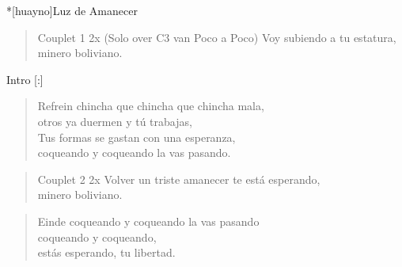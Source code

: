 \clearpage
\begin{song}*[huayno]{Luz de Amanecer}
\begin{verse}{Couplet 1 2x (Solo over C3 van Poco a Poco)}
Voy subiendo a tu estatura, \\
minero boliviano. \hspace{4em} \hspace{1em} 
\end{verse}

\begin{instrumental}{Intro}
\measure{}\measure{}\measure{}\measure{}
\measure{}\measure{}\measure{}\measure{}[:]
\end{instrumental}


\begin{verse}{Refrein}
chincha que chincha que chincha mala,\\
otros ya duermen y tú trabajas,\\
Tus formas se gastan con una esperanza,\\
coqueando y coqueando la vas pasando. \hspace{4em} \hspace{1em} 
\end{verse}


\begin{verse}{Couplet 2 2x}
Volver un triste amanecer te está esperando,\\
minero boliviano. \hspace{4em} \hspace{1em} 
\end{verse}


\begin{verse}{Einde}
coqueando y coqueando la vas pasando\\
coqueando y coqueando,\\
estás esperando, tu libertad. \hspace{3em} \hspace{2em} \hspace{2em} \hspace{1em} \hspace{1em}
\end{verse}
\end{song}

